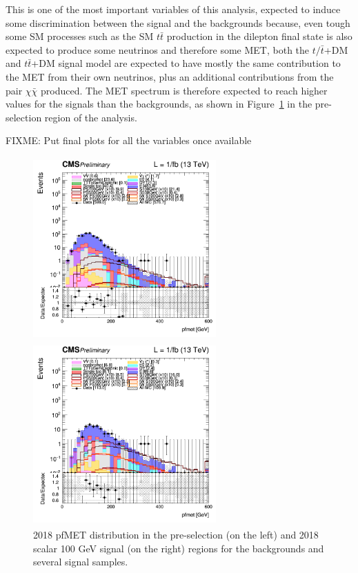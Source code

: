 \documentclass[a4paper, 10pt, openright]{report}
\begin{document}
This is one of the most important variables of this analysis, expected to induce some discrimination between the signal and the backgrounds because, even tough some \ac{SM} processes such as the \ac{SM} $t \bar t$ production in the dilepton final state is also expected to produce some neutrinos and therefore some \ac{MET}, both the $t/ \bar t$+DM and $t \bar t$+DM signal model are expected to have mostly the same contribution to the \ac{MET} from their own neutrinos, plus an additional contributions from the pair $\chi \bar \chi$ produced. The \ac{MET} spectrum is therefore expected to reach higher values for the signals than the backgrounds, as shown in Figure~\ref{fig:SRdiscMET} in the pre-selection region of the analysis.

\color{red} FIXME: Put final plots for all the variables once available \color{black}

\begin{figure}[htbp]
\centering
\begin{minipage}[b]{.47\textwidth}
\includegraphics[width=7cm, height=7cm]{figs/log_cratio_topCR_ll_METcorrected_pt_2018.png}
\end{minipage}\hfill
\begin{minipage}[b]{.47\textwidth}
\includegraphics[width=7cm, height=7cm]{figs/log_cratio_topCR_ll_DNN_signal0_scalar100_METcorrected_pt_2018.png}
\end{minipage}\hfill
\caption{2018 pf\ac{MET} distribution in the pre-selection (on the left) and 2018 scalar 100 GeV signal (on the right) regions for the backgrounds and several signal samples.}
\label{fig:SRdiscMET}
\end{figure}
\end{document}
